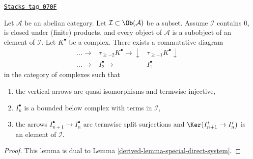 \begin{lemma}
\label{derived-lemma-special-inverse-system}
\href{https://stacks.math.columbia.edu/tag/070F}{\texttt{Stacks tag 070F}}

Let $\mathcal{A}$ be an abelian category. Let
$\mathcal{I} \subset \Ob(\mathcal{A})$ be a subset.
Assume $\mathcal{I}$ contains $0$, is closed under (finite) products,
and every object of $\mathcal{A}$ is a subobject of an
element of $\mathcal{I}$. Let $K^\bullet$ be a complex.
There exists a commutative diagram
$$
\begin{array}{ccc}\ldots \longrightarrow & \tau_{\geq -2}K^\bullet \longrightarrow\downarrow & \tau_{\geq -1}K^\bullet \downarrow \\ \ldots \longrightarrow & I_2^\bullet \longrightarrow & I_1^\bullet\end{array}
$$
in the category of complexes such that
\begin{enumerate}
\item the vertical arrows are quasi-isomorphisms and termwise injective,
\item $I_n^\bullet$ is a bounded below complex with terms in $\mathcal{I}$,
\item the arrows $I_{n + 1}^\bullet \to I_n^\bullet$ are termwise split
surjections and $\Ker(I^i_{n + 1} \to I^i_n)$ is an element of $\mathcal{I}$.
\end{enumerate}
\end{lemma}

\begin{proof}

This lemma is dual to
Lemma \ref{derived-lemma-special-direct-system}.
\end{proof}

